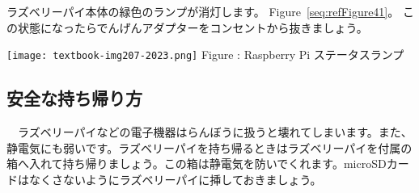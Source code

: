 \documentclass[a4paper,12pt]{jarticle}
\begin{document}
\bigskip
\flushleft
\textcolor[rgb]{0.13333334,0.13333334,0.13333334}{ラズベリーパイ本体の緑色のランプが消灯します。
  Figure~\ref{seq:refFigure41}。
  この状態になったらでんげんアダプターをコンセントから抜きましょう。}

\bigskip
\centering
\begin{minipage}{8.207cm}
  {\upshape
    \texttt{[image: textbook-img207-2023.png]}
    \newline
    Figure {\theFigure\label{seq:refFigure41}}: Raspberry Pi
    ステータスランプ}
\end{minipage}
\clearpage\subsection{安全な持ち帰り方}
\flushleft
\ \ ラズベリーパイなどの電子機器はらんぼうに扱うと壊れてしまいます。また、静電気にも弱いです。ラズベリーパイを持ち帰るときはラズベリーパイを付属の箱へ入れて持ち帰りましょう。この箱は静電気を防いでくれます。microSDカードはなくさないようにラズベリーパイに挿しておきましょう。

\clearpage
\end{document}
